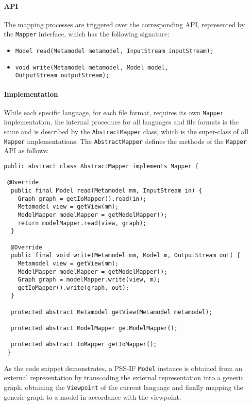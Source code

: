 \paragraph{API} The mapping processes are triggered over the corresponding API, represented by the \texttt{Mapper} interface, which has the following signature:

\begin{itemize}
\item \texttt{Model read(Metamodel metamodel, InputStream inputStream);}
\item \texttt{void write(Metamodel metamodel, Model model,}\\ \texttt{OutputStream outputStream);}
\end{itemize}

\paragraph{Implementation} While each specific language, for each file format, requires its own \texttt{Mapper} implementation, the internal procedure for all languages and file formats is the same and is described by the \texttt{AbstractMapper} class, which is the super-class of all \texttt{Mapper} implementations. The \texttt{AbstractMapper} defines the methods of the \texttt{Mapper} API as follows:

\begin{verbatim}
public abstract class AbstractMapper implements Mapper {

 @Override
  public final Model read(Metamodel mm, InputStream in) {
    Graph graph = getIoMapper().read(in);
    Metamodel view = getView(mm);
    ModelMapper modelMapper = getModelMapper();
    return modelMapper.read(view, graph);
  }

  @Override
  public final void write(Metamodel mm, Model m, OutputStream out) {
    Metamodel view = getView(mm);
    ModelMapper modelMapper = getModelMapper();
    Graph graph = modelMapper.write(view, m);
    getIoMapper().write(graph, out);
  }

  protected abstract Metamodel getView(Metamodel metamodel);

  protected abstract ModelMapper getModelMapper();

  protected abstract IoMapper getIoMapper();
 }
\end{verbatim}

As the code snippet demonstrates, a PSS-IF \texttt{Model} instance is obtained from an external representation by transcoding the external representation into a generic graph, obtaining the \texttt{Viewpoint} of the current language and finally mapping the generic graph to a model in accordance with the viewpoint.

